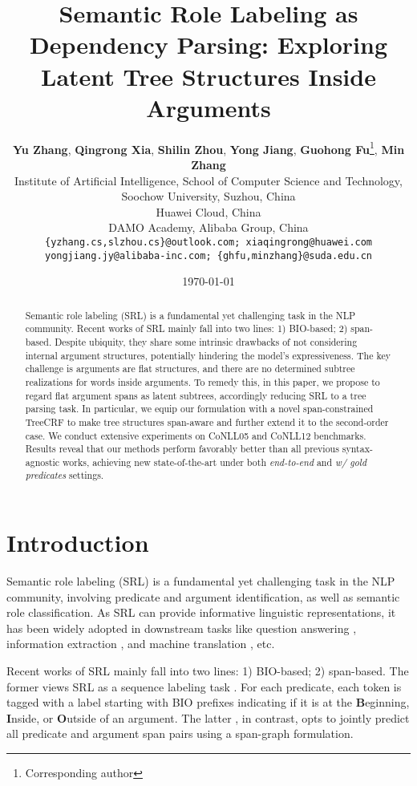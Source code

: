 \documentclass[11pt]{article}
\title{Semantic Role Labeling as Dependency Parsing: Exploring \\
Latent Tree Structures Inside Arguments}
\author{
    \textbf{Yu Zhang}\suda,
    \textbf{Qingrong Xia}\suda\huawei,
    \textbf{Shilin Zhou}\suda,
    \textbf{Yong Jiang}\damo,
    \textbf{Guohong Fu}\suda\thanks{Corresponding author},
    \textbf{Min Zhang}\suda \\
    \suda Institute of Artificial Intelligence, School of Computer Science and Technology, \\
    Soochow University, Suzhou, China\\
    \huawei Huawei Cloud, China \\
    \damo DAMO Academy, Alibaba Group, China \\
    \texttt{\{yzhang.cs,slzhou.cs\}@outlook.com; xiaqingrong@huawei.com} \\
    \texttt{yongjiang.jy@alibaba-inc.com; \{ghfu,minzhang\}@suda.edu.cn}
}
\date{\today}
\begin{document}
\maketitle
\begin{abstract}
    Semantic role labeling (SRL) is a fundamental yet challenging task in the NLP community.
    Recent works of SRL mainly fall into two lines: 1) BIO-based; 2) span-based.
    Despite ubiquity, they share some intrinsic drawbacks of not considering internal argument structures, potentially hindering the model's expressiveness.
    The key challenge is arguments are flat structures, and there are no determined subtree realizations for words inside arguments.
    To remedy this, in this paper, we propose to regard flat argument spans as latent subtrees, accordingly reducing SRL to a tree parsing task.
    In particular, we equip our formulation with a novel span-constrained TreeCRF to make tree structures span-aware and further extend it to the second-order case.
    We conduct extensive experiments on CoNLL05 and CoNLL12 benchmarks.
    Results reveal that our methods perform favorably better than all previous syntax-agnostic works, achieving new state-of-the-art under both \emph{end-to-end} and \emph{w/ gold predicates} settings.
\end{abstract}

\section{Introduction}\label{sec:intro}

Semantic role labeling (SRL) is a fundamental yet challenging task in the NLP community, involving predicate and argument identification, as well as semantic role classification.
As SRL can provide informative linguistic representations, it has been widely adopted in downstream tasks like question answering \cite{berant-etal-2013-semantic,yih-etal-2016-value}, information extraction \cite{christensen-etal-2010-semantic,lin-etal-2017-neural}, and machine translation \cite{liu-gildea-2010-semantic,bazrafshan-gildea-2013-semantic}, etc.

Recent works of SRL mainly fall into two lines: 1) BIO-based; 2) span-based.
The former views SRL as a sequence labeling task \cite{zhou-xu-2015-end,strubell-etal-2018-lisa,shi-etal-2019-simple}.
For each predicate, each token is tagged with a label starting with BIO prefixes indicating if it is at the \textbf{B}eginning, \textbf{I}nside, or \textbf{O}utside of an argument.
The latter \cite{he-etal-2018-jointly,ouchi-etal-2018-span,li-etal-2019-dependency}, in contrast, opts to jointly predict all predicate and argument span pairs using a span-graph formulation.
\end{document}
